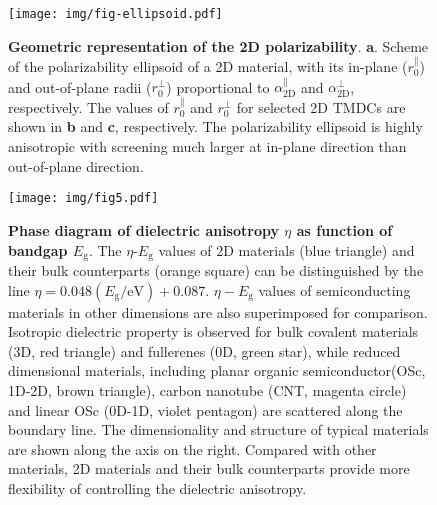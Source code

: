 \documentclass[journal=ancac3,manuscript=article,email=true,hyperref=true,keywords=false]{achemso}
\begin{document}
\begin{figure}[H]
  \centering
  \texttt{[image: img/fig-ellipsoid.pdf]}
  \caption{\label{fig-ellip} \textbf{Geometric representation of the
      2D polarizability}. \textbf{a}. Scheme of the polarizability
    ellipsoid of a 2D material, with its in-plane
    ($r_{0}^{\parallel}$) and out-of-plane radii
    ($r_{\mathrm{0}}^{\perp}$) proportional to
    $\alpha_{\mathrm{2D}}^{\parallel}$ and
    $\alpha_{\mathrm{2D}}^{\perp}$, respectively.  The values of
    $r_{0}^{\parallel}$ and $r_{0}^{\perp}$ for selected 2D TMDCs are
    shown in \textbf{b} and \textbf{c}, respectively.  The
    polarizability ellipsoid is highly anisotropic with screening much
    larger at in-plane direction than out-of-plane direction.}
\end{figure}



\begin{figure}[H]
  \centering
  \texttt{[image: img/fig5.pdf]}
  \caption{\textbf{Phase diagram of dielectric anisotropy $\eta$ as
      function of bandgap $E_{\mathrm{g}}$}. The
    $\eta$-$E_{\mathrm{g}}$ values of 2D materials (blue triangle) and
    their bulk counterparts (orange square) can be distinguished by
    the line $\eta=0.048(E_{\mathrm{g}}/\mathrm{eV})+0.087$. $\eta-E_{\mathrm{g}}$ values of
    semiconducting materials in other dimensions are also superimposed
    for comparison. Isotropic dielectric property is observed for bulk
    covalent materials (3D, red triangle) and fullerenes (0D, green
    star), while reduced dimensional materials, including planar
    organic semiconductor(OSc, 1D-2D, brown triangle), carbon nanotube
    (CNT, magenta circle) and linear OSc (0D-1D, violet pentagon) are
    scattered along the boundary line. The dimensionality and
    structure of typical materials are shown along the axis on the
    right. Compared with other materials, 2D materials and their bulk
    counterparts provide more flexibility of controlling the
    dielectric anisotropy.}
  \label{fig:aniso}
\end{figure}
\end{document}

